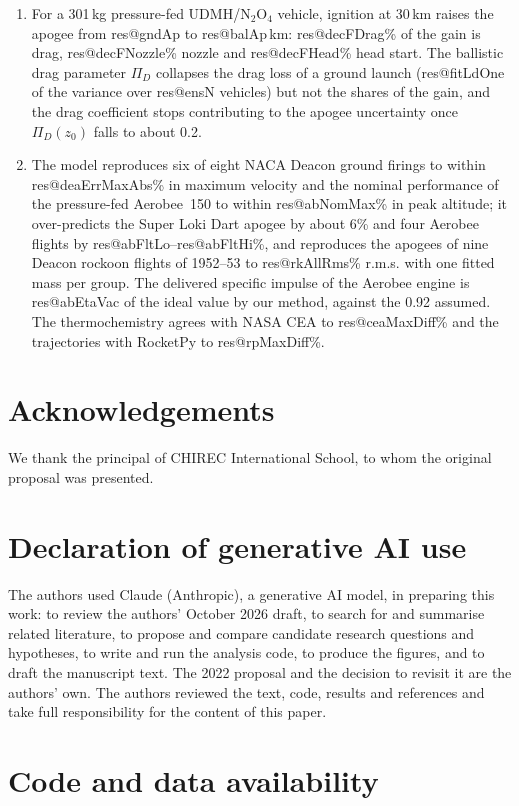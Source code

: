 \documentclass[11pt,a4paper]{article}
\makeatletter
\newcommand{\R}[1]{\csname res@#1\endcsname}
\makeatother
\begin{document}
\begin{enumerate}
\item For a 301\,kg pressure-fed UDMH/N$_2$O$_4$ vehicle, ignition at 30\,km raises the apogee from \R{gndAp} to \R{balAp}\,km: \R{decFDrag}\% of the gain is drag, \R{decFNozzle}\% nozzle and \R{decFHead}\% head start. The ballistic drag parameter $\Pi_D$ collapses the drag loss of a ground launch (\R{fitLdOne} of the variance over \R{ensN} vehicles) but not the shares of the gain, and the drag coefficient stops contributing to the apogee uncertainty once $\Pi_D(z_0)$ falls to about 0.2.
\item The model reproduces six of eight NACA Deacon ground firings to within \R{deaErrMaxAbs}\% in maximum velocity and the nominal performance of the pressure-fed Aerobee~150 to within \R{abNomMax}\% in peak altitude; it over-predicts the Super Loki Dart apogee by about 6\% and four Aerobee flights by \R{abFltLo}--\R{abFltHi}\%, and reproduces the apogees of nine Deacon rockoon flights of 1952--53 to \R{rkAllRms}\% r.m.s. with one fitted mass per group. The delivered specific impulse of the Aerobee engine is \R{abEtaVac} of the ideal value by our method, against the 0.92 assumed. The thermochemistry agrees with NASA CEA to \R{ceaMaxDiff}\% and the trajectories with RocketPy to \R{rpMaxDiff}\%.
\end{enumerate}

\section*{Acknowledgements}

We thank the principal of CHIREC International School, to whom the original proposal was presented.

\section*{Declaration of generative AI use}

The authors used Claude (Anthropic), a generative AI model, in preparing this work: to review the authors' October 2026 draft, to search for and summarise related literature, to propose and compare candidate research questions and hypotheses, to write and run the analysis code, to produce the figures, and to draft the manuscript text. The 2022 proposal and the decision to revisit it are the authors' own. The authors reviewed the text, code, results and references and take full responsibility for the content of this paper.

\section*{Code and data availability}
\end{document}

